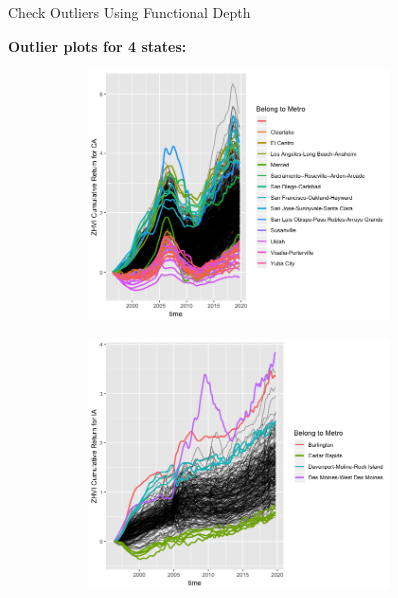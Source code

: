 \documentclass[final]{beamer}
\newlength{\sepwidth}
\newlength{\colwidth}
\newcommand{\separatorcolumn}{\begin{column}{\sepwidth}\end{column}}
\begin{document}
\begin{frame}[t]
\begin{columns}[t]
\begin{column}{\colwidth}
\end{column}

\separatorcolumn







\begin{column}{\colwidth}

  \vspace{-1em}

  \begin{block}{Check Outliers Using Functional Depth}
  
\textbf{Outlier plots for 4 states:}

\begin{figure}[h]
  \begin{subfigure}{0.52\textwidth}
    \centering
    \includegraphics[width=0.95\linewidth]{figure/f_outlier_CA.png}
  \end{subfigure}%
    \begin{subfigure}{0.52\textwidth}
    \centering
    \includegraphics[width=0.95\linewidth]{figure/f_outlier_IA.png}

\end{subfigure}
\end{figure}
\end{block}
\end{column}
\end{columns}
\end{frame}
\end{document}
